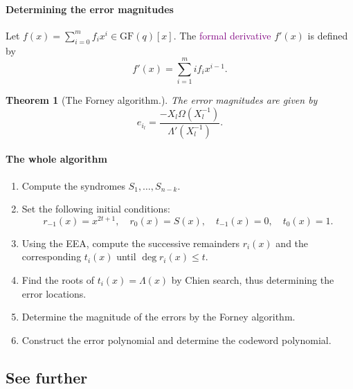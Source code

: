 \documentclass[a4paper, 11pt, openany]{book}
\numberwithin{equation}{section}
\theoremstyle{plain}
\newtheorem{theorem}	[equation]	{Theorem}
\theoremstyle{definition}
\newcommand{\GF}{\mathrm{GF}}
\newcommand{\Define}[1]{\textcolor{purple}{#1}}
\begin{document}
\paragraph{Determining the error magnitudes}
Let $f(x) = \sum_{i=0}^m f_i x^i \in \GF(q)[x]$. The \Define{formal derivative} $f'(x)$ is defined by
$$
	f'(x) = \sum_{i=1}^m i f_i x^{i-1}.
$$ 

\begin{theorem}[The Forney algorithm.] 
The error magnitudes are given by
$$
	e_{i_l} = \frac{- X_l \Omega(X_l^{-1})} {\Lambda'(X_l^{-1})}.
$$
\end{theorem}




\paragraph{The whole algorithm}

\begin{enumerate}
	\item Compute the syndromes $S_1, \dots, S_{n-k}$.
	
	\item Set the following initial conditions:
	$$
		r_{-1}(x) = x^{2t+1}, \quad r_0(x) = S(x), \quad t_{-1}(x) = 0, \quad t_0(x) = 1.
	$$
	
	\item Using the EEA, compute the successive remainders $r_i(x)$ and the corresponding $t_i(x)$ until $\deg r_i(x) \le t$.
	
	\item Find the roots of $t_i(x) = \Lambda(x)$ by Chien search, thus determining the error locations.
	
	\item Determine the magnitude of the errors by the Forney algorithm.
	
	\item Construct the error polynomial and determine the codeword polynomial.
\end{enumerate}


\subsection{See further}
\end{document}
